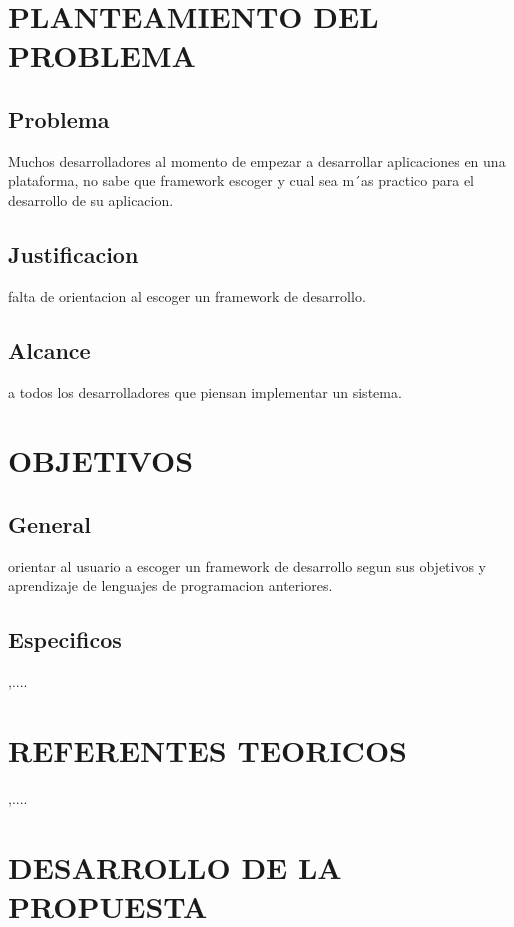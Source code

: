 {{\section{PLANTEAMIENTO DEL PROBLEMA}
\subsection{Problema}

\item{Muchos desarrolladores al momento de empezar a desarrollar aplicaciones en una plataforma, no sabe que framework escoger y cual sea m´as practico para el desarrollo de su aplicacion.}

\subsection{Justificacion}
\item{falta de orientacion al escoger un framework de desarrollo.}

\subsection{Alcance}
\item{ a todos los desarrolladores que piensan implementar un sistema.}

\section{OBJETIVOS}

\subsection{General}
\item{  orientar al usuario a escoger un framework de desarrollo segun sus objetivos y aprendizaje de lenguajes de programacion anteriores.}

\subsection{Especificos}
\item{,....}

\section{REFERENTES TEORICOS}
\item{,....}


\newpage

\section{DESARROLLO DE LA PROPUESTA}

}}
